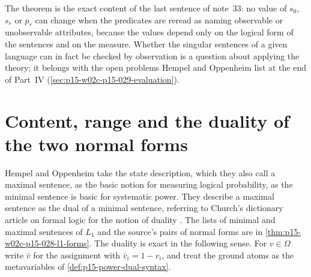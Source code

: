 The theorem is the exact content of the last sentence of note~33: no
value of \(s_0\), \(s_r\) or \(p_r\) can change when the predicates are
reread as naming observable or unobservable attributes, because the
values depend only on the logical form of the sentences and on the
measure. Whether the singular sentences of a given language can in fact
be checked by observation is a question about applying the theory; it
belongs with the open problems Hempel and Oppenheim list at the end of
Part~IV (\cref{sec:p15-w02c-p15-029-evaluation}).

\section{Content, range and the duality of the two normal forms}
\label{sec:p15-w02c-p15-029-content-range}

Hempel and Oppenheim take the state description, which they also call a
maximal sentence, as the basic notion for measuring logical probability,
as the minimal sentence is basic for systematic power. They describe a
maximal sentence as the dual of a minimal sentence, referring to Church's
dictionary article on formal logic for the notion of duality
\cite[p.~168, n.~36]{HempelOppenheim1948Explanation}. The lists of
minimal and maximal sentences of \(L_1\) and the source's pairs of normal
forms are in \cref{thm:p15-w02c-p15-028-l1-forms}. The duality is exact
in the following sense. For \(v\in\Omega\) write \(\bar v\) for the
assignment with \(\bar v_i=1-v_i\), and treat the ground atoms as the
metavariables of \cref{def:p15-power-dual-syntax}.

